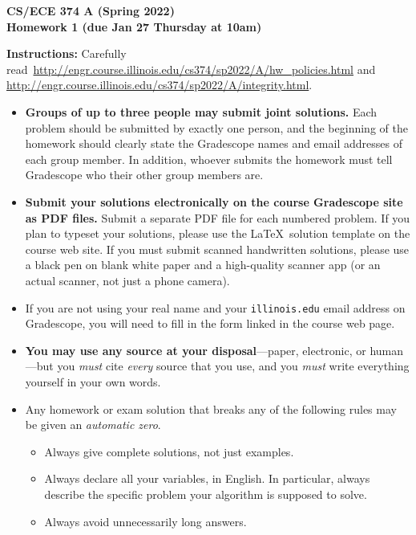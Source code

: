 \documentclass[11pt]{article}
\begin{document}
\begin{center}\Large\bf 
CS/ECE 374 A (Spring 2022)\\
{\Large Homework 1} (due Jan 27 Thursday at 10am)
\end{center}

\medskip\noindent\hrulefill\bigskip

\noindent
{\bf Instructions:} Carefully read\  
\url{http://engr.course.illinois.edu/cs374/sp2022/A/hw_policies.html}
and \url{http://engr.course.illinois.edu/cs374/sp2022/A/integrity.html}.


\begin{itemize}
    \item \textbf{Groups of up to three people may submit joint
       solutions.}  Each problem should be submitted by exactly one
    person, and the beginning of the homework should clearly state the
    Gradescope names and email addresses of each group member.  In
    addition, whoever submits the homework must tell Gradescope who
    their other group members are.

    \item \textbf{Submit your solutions electronically on the course
       Gradescope site as PDF files.}  Submit a separate PDF file for
    each numbered problem.  If you plan to typeset your solutions,
    please use the \LaTeX\ solution template on the course web site.
    If you must submit scanned handwritten solutions, please use a
    black pen on blank white paper and a high-quality scanner app (or
    an actual scanner, not just a phone camera).

    \item If you are not using your real name and your
    \texttt{illinois.edu} email address on Gradescope, you will need
    to fill in the form linked in the course web page. 

    \item \textbf{You may use any source at your disposal}---paper,
    electronic, or human---but you \emph{must} cite \emph{every} source
    that you use, and you \emph{must} write everything yourself in
    your own words.  

    \item Any homework or exam
    solution that breaks any of the following rules may be given an
    \emph{automatic zero}.
    \begin{itemize}
        \item Always give complete solutions, not just examples.
        \item Always declare all your variables, in English.  In
        particular, always describe the specific problem your
        algorithm is supposed to solve.     
        \item Always avoid unnecessarily long answers.
    \end{itemize}
\end{itemize}
\hrulefill
\end{document}
